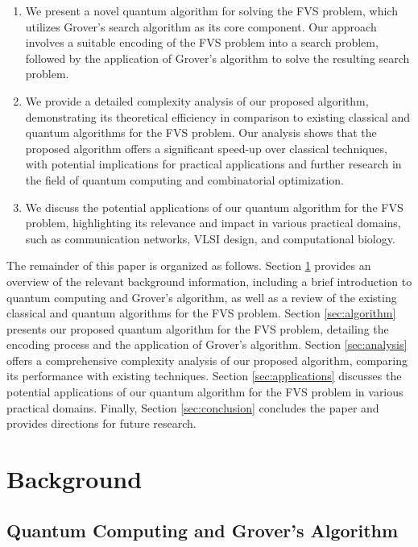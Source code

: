 \begin{enumerate}
    \item We present a novel quantum algorithm for solving the FVS problem, which utilizes Grover's search algorithm as its core component. Our approach involves a suitable encoding of the FVS problem into a search problem, followed by the application of Grover's algorithm to solve the resulting search problem.
    
    \item We provide a detailed complexity analysis of our proposed algorithm, demonstrating its theoretical efficiency in comparison to existing classical and quantum algorithms for the FVS problem. Our analysis shows that the proposed algorithm offers a significant speed-up over classical techniques, with potential implications for practical applications and further research in the field of quantum computing and combinatorial optimization.
    
    \item We discuss the potential applications of our quantum algorithm for the FVS problem, highlighting its relevance and impact in various practical domains, such as communication networks, VLSI design, and computational biology.
\end{enumerate}

The remainder of this paper is organized as follows. Section \ref{sec:background} provides an overview of the relevant background information, including a brief introduction to quantum computing and Grover's algorithm, as well as a review of the existing classical and quantum algorithms for the FVS problem. Section \ref{sec:algorithm} presents our proposed quantum algorithm for the FVS problem, detailing the encoding process and the application of Grover's algorithm. Section \ref{sec:analysis} offers a comprehensive complexity analysis of our proposed algorithm, comparing its performance with existing techniques. Section \ref{sec:applications} discusses the potential applications of our quantum algorithm for the FVS problem in various practical domains. Finally, Section \ref{sec:conclusion} concludes the paper and provides directions for future research.

\section{Background}\label{sec:background}

\subsection{Quantum Computing and Grover's Algorithm}

